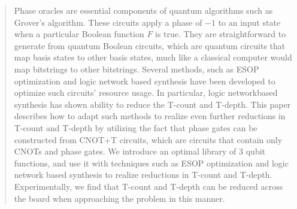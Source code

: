 \documentclass[conference]{IEEEtran}
\begin{document}
\begin{abstract}
  Phase oracles are essential components of quantum algorithms such as Grover's algorithm. These circuits apply a phase of $-1$ to an input state when a particular Boolean function $F$ is true. They are straightforward to generate from quantum Boolean circuits, which are quantum circuits that map basis states to other basis states, much like a classical computer would map bitstrings to other bitstrings. Several methods, such as ESOP optimization and logic network based synthesis have been developed to optimize such circuits' resource usage. In particular, logic networkbased synthesis has shown ability to reduce the T-count and T-depth. This paper describes how to adapt such methods to realize even further reductions in T-count and T-depth by utilizing the fact that phase gates can be constructed from CNOT+T circuits, which are circuits that contain only CNOTs and phase gates. We introduce an optimal library of 3 qubit functions, and use it with techniques such as ESOP optimization and logic network based synthesis to realize reductions in T-count and T-depth. Experimentally, we find that T-count and T-depth can be reduced across the board when approaching the problem in this manner.

\end{abstract}













\renewcommand{\baselinestretch}{1.10}


\end{document}
